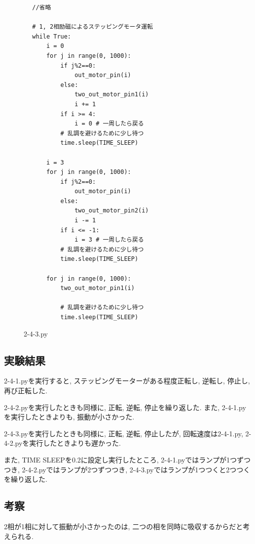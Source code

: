 \documentclass{ltjsarticle} %
\begin{document}
    

    \begin{mdframed}
      \begin{verbatim}
        //省略
    
        # 1, 2相励磁によるステッピングモータ運転
        while True:
            i = 0
            for j in range(0, 1000):
                if j%2==0:
                    out_motor_pin(i)
                else:
                    two_out_motor_pin1(i)
                    i += 1              
                if i >= 4:
                    i = 0 # ⼀周したら戻る
                # 乱調を避けるために少し待つ
                time.sleep(TIME_SLEEP)

            i = 3
            for j in range(0, 1000):   
                if j%2==0:
                    out_motor_pin(i)
                else:
                    two_out_motor_pin2(i) 
                    i -= 1
                if i <= -1:
                    i = 3 # ⼀周したら戻る
                # 乱調を避けるために少し待つ
                time.sleep(TIME_SLEEP)

            for j in range(0, 1000):   
                two_out_motor_pin1(i)

                # 乱調を避けるために少し待つ
                time.sleep(TIME_SLEEP)  	
      \end{verbatim}
      \end{mdframed}
      \begin{figure}[H]
      \caption{2-4-3.py}
      \label{fig:2-4-3py}
      \end{figure}    


\subsection{実験結果}
2-4-1.pyを実行すると, ステッピングモーターがある程度正転し, 逆転し, 停止し, 再び正転した. 

2-4-2.pyを実行したときも同様に, 正転, 逆転, 停止を繰り返した. 
また, 2-4-1.pyを実行したときよりも, 振動が小さかった. 

2-4-3.pyを実行したときも同様に, 正転, 逆転, 停止したが, 回転速度は2-4-1.py, 2-4-2.pyを実行したときよりも遅かった. 

また, TIME SLEEPを0.2に設定し実行したところ, 2-4-1.pyではランプが1つずつつき, 
2-4-2.pyではランプが2つずつつき, 2-4-3.pyではランプが1つつくと2つつくを繰り返した. 

\subsection{考察}
2相が1相に対して振動が小さかったのは, ⼆つの相を同時に吸収するからだと考えられる. 
\end{document}
